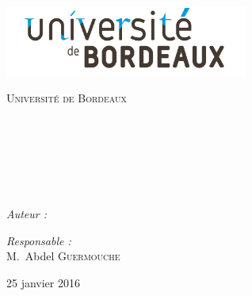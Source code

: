 \begin{titlepage}

\begin{center}

\begin{minipage}[t]{0.48\textwidth}
  \begin{flushleft}
    \includegraphics [width=80mm]{images/logo-univ.jpg} \\[0.5cm]
    \begin{spacing}{1.5}
      \textsc{\LARGE Université de Bordeaux}
    \end{spacing}
  \end{flushleft}
\end{minipage} \\[1.5cm]

\textsc{\Large \reportsubject}\\[0.5cm]
\HRule \\[0.4cm]
{\huge \bfseries \reporttitle}\\[0.4cm]
\HRule \\[1.5cm]

\begin{minipage}[t]{0.3\textwidth}
  \begin{flushleft} \large
    \emph{Auteur :}\\
    \reportauthor
  \end{flushleft}
\end{minipage}
\begin{minipage}[t]{0.6\textwidth}
  \begin{flushright} \large
    \emph{Responsable :} \\
    M.~Abdel \textsc{Guermouche} \\
  \end{flushright}
\end{minipage}

\vfill

{\large 25 janvier 2016}

\end{center}

\end{titlepage}
